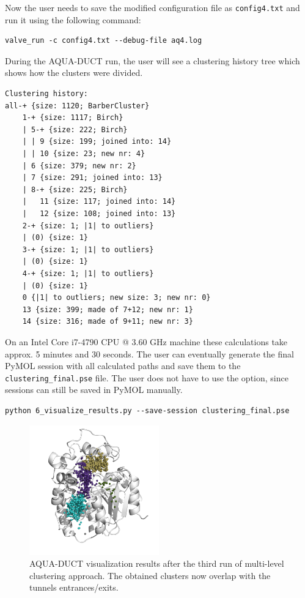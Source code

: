 \documentclass[9pt,tutorial]{livecoms}
\begin{document}
Now the user needs to save the modified configuration file as \texttt{config4.txt} and run it using the following command:
\begin{lstlisting}[columns=fullflexible]
valve_run -c config4.txt --debug-file aq4.log
\end{lstlisting}
During the AQUA-DUCT run, the user will see a clustering history tree which shows how the clusters were divided.
\begin{lstlisting}
Clustering history:
all-+ {size: 1120; BarberCluster}
    1-+ {size: 1117; Birch}
    | 5-+ {size: 222; Birch}
    | | 9 {size: 199; joined into: 14}
    | | 10 {size: 23; new nr: 4}
    | 6 {size: 379; new nr: 2}
    | 7 {size: 291; joined into: 13}
    | 8-+ {size: 225; Birch}
    |   11 {size: 117; joined into: 14}
    |   12 {size: 108; joined into: 13}
    2-+ {size: 1; |1| to outliers}
    | (0) {size: 1}
    3-+ {size: 1; |1| to outliers}
    | (0) {size: 1}
    4-+ {size: 1; |1| to outliers}
    | (0) {size: 1}
    0 {|1| to outliers; new size: 3; new nr: 0}
    13 {size: 399; made of 7+12; new nr: 1}
    14 {size: 316; made of 9+11; new nr: 3}
\end{lstlisting}

On an Intel Core i7-4790 CPU @ 3.60 GHz machine these calculations take approx. 5 minutes and 30 seconds. The user can eventually generate the final PyMOL session with all calculated paths and save them to the \texttt{clustering\_final.pse} file. The user does not have to use the option, since sessions can still be saved in PyMOL manually.
\begin{lstlisting}
python 6_visualize_results.py --save-session clustering_final.pse
\end{lstlisting}

\begin{figure}[ht!]
\centering
\includegraphics[width=0.5\textwidth]{Tut2.3.png}
\caption{AQUA-DUCT visualization results after the third run of multi-level clustering approach. The obtained clusters now overlap with the tunnels entrances/exits.}
\label{Tut2.3}
\end{figure}
\end{document}
